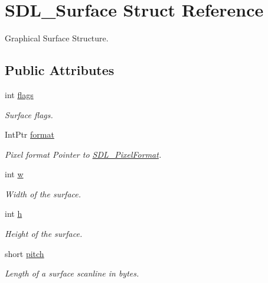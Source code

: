 \hypertarget{struct_s_d_l___surface}{
\section{SDL\_\-Surface Struct Reference}
\label{struct_s_d_l___surface}
}


Graphical Surface Structure.  


\subsection*{Public Attributes}
\begin{DoxyCompactItemize}
\item 
int \hyperlink{struct_s_d_l___surface_a9b902c7b843cd1cc115de47efd82979b}{flags}
\begin{DoxyCompactList}\small\item\em Surface flags. \item\end{DoxyCompactList}\item 
IntPtr \hyperlink{struct_s_d_l___surface_ad70ef89eb3879b7310311b3da48aa393}{format}
\begin{DoxyCompactList}\small\item\em Pixel format Pointer to \hyperlink{struct_s_d_l___pixel_format}{SDL\_\-PixelFormat}. \item\end{DoxyCompactList}\item 
int \hyperlink{struct_s_d_l___surface_ae80caa4de3b72895c314a9a7b099149a}{w}
\begin{DoxyCompactList}\small\item\em Width of the surface. \item\end{DoxyCompactList}\item 
int \hyperlink{struct_s_d_l___surface_a4c41b17fe185ae45b0a2ffba5d09c1d8}{h}
\begin{DoxyCompactList}\small\item\em Height of the surface. \item\end{DoxyCompactList}\item 
short \hyperlink{struct_s_d_l___surface_a5a49b2858d06c49d2bb95ad39a6c62d7}{pitch}
\begin{DoxyCompactList}\small\item\em Length of a surface scanline in bytes. \item\end{DoxyCompactList}\item 

\end{DoxyCompactItemize}
